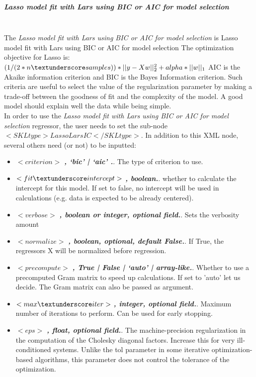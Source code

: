 \subparagraph{Lasso model fit with Lars using BIC or AIC for model selection}
\mbox{}
\\The \textit{Lasso model fit with Lars using BIC or AIC for model selection} is Lasso model fit with Lars using BIC or AIC for model selection
The optimization objective for Lasso is:
$(1 / (2 * n \textunderscore samples)) * ||y - Xw||^2_2 + alpha * ||w||_1$
AIC is the Akaike information criterion and BIC is the Bayes Information criterion. Such criteria are useful to select the value of the regularization parameter by making a trade-off between the goodness of fit and the complexity of the model. A good model should explain well the data while being simple.
\\In order to use the \textit{Lasso model fit with Lars using BIC or AIC for model selection} regressor, the user needs to set the sub-node $<SKLtype>LassoLarsIC</SKLtype>$.
In addition to this XML node, several others need (or not) to be inputted:
\begin{itemize}
  \item $<criterion>$ \textbf{\textit{, ‘bic’ | ‘aic’ .}}. The type of criterion to use.
  \item $<fit \textunderscore intercept>$ \textbf{\textit{, boolean.}}. whether to calculate the intercept for this model. If set to false, no intercept will be used in calculations (e.g. data is expected to be already centered).
  \item $<verbose>$ \textbf{\textit{, boolean or integer, optional field.}}. Sets the verbosity amount
  \item $<normalize>$ \textbf{\textit{, boolean, optional, default False.}}. If True, the regressors X will be normalized before regression.
  \item $<precompute>$ \textbf{\textit{, True | False | ‘auto’ | array-like.}}. Whether to use a precomputed Gram matrix to speed up calculations. If set to 'auto' let us decide. The Gram matrix can also be passed as argument.
  \item $<max \textunderscore iter>$ \textbf{\textit{, integer, optional field.}}. Maximum number of iterations to perform. Can be used for early stopping.
  \item $<eps>$ \textbf{\textit{, float, optional field.}}. The machine-precision regularization in the computation of the Cholesky diagonal factors. Increase this for very ill-conditioned systems. Unlike the tol parameter in some iterative optimization-based algorithms, this parameter does not control the tolerance of the optimization.
\end{itemize}

